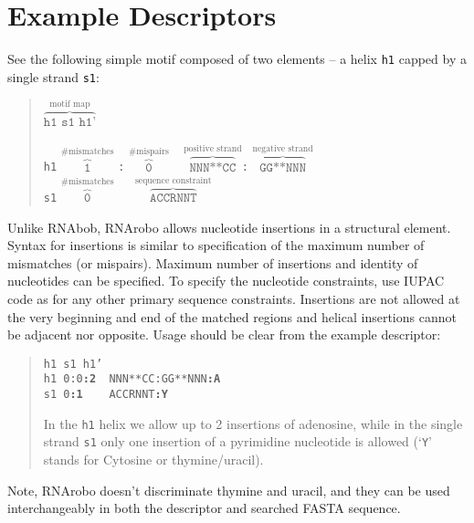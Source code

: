 \documentclass[11pt]{article}
\begin{document}
\section*{Example Descriptors}
See the following simple motif composed of two elements -- a helix \texttt{h1} capped by a single strand \texttt{s1}:
\begin{quote}
$\overbrace{\texttt{h1 s1 h1'}}^{\text{motif map}}$\\\\
\texttt{h1} $\overbrace{\texttt{1}}^{\text{\# mismatches}}$ \texttt{:} $\overbrace{\texttt{0}}^{\text{\# mispairs}}$ ~
$\overbrace{\texttt{NNN**CC}}^{\text{positive strand}}$\texttt{:}
$\overbrace{\texttt{GG**NNN}}^{\text{negative strand}}$ \\

\texttt{s1} $\overbrace{\texttt{0}}^{\text{\# mismatches}}$ ~~
$\overbrace{\texttt{ACCRNNT}}^{\text{sequence constraint}}$

\end{quote}

Unlike RNAbob, RNArobo allows nucleotide insertions in a structural element. Syntax for insertions is similar to specification of the maximum number of mismatches (or mispairs). Maximum number of insertions and identity of nucleotides can be specified. To specify the nucleotide constraints, use IUPAC code as for any other primary sequence constraints.  Insertions are not allowed at the very beginning and end of the matched regions and helical insertions cannot be adjacent nor opposite. Usage should be clear from the example descriptor:

\begin{quote}
\texttt{h1 s1 h1'}\\
\texttt{h1 0:0\textbf{:2} ~NNN**CC:GG**NNN\textbf{:A}}\\
\texttt{s1 0\textbf{:1} ~~~ACCRNNT\textbf{:Y}}

In the \texttt{h1} helix we allow up to 2 insertions of adenosine, while in the single strand \texttt{s1} only one insertion of a pyrimidine nucleotide is allowed (`\texttt{Y}' stands for Cytosine or thymine/uracil). 
\end{quote}

Note, RNArobo doesn't discriminate thymine and uracil, and they can be used interchangeably in both the descriptor and searched FASTA sequence.
\end{document}
